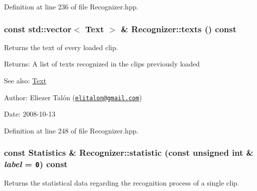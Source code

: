 Definition at line 236 of file Recognizer.hpp.\hypertarget{class_recognizer_2a365c34f1447cdc3311d311e02bf2ed}{
\subsubsection[texts]{\setlength{\rightskip}{0pt plus 5cm}const std::vector$<$ {\bf Text} $>$ \& Recognizer::texts () const}}
\label{class_recognizer_2a365c34f1447cdc3311d311e02bf2ed}


Returns the text of every loaded clip. 

\begin{Desc}
\item[Returns:]A list of texts recognized in the clips previously loaded\end{Desc}
\begin{Desc}
\item[See also:]\hyperlink{class_text}{Text}\end{Desc}
\begin{Desc}
\item[Author:]Eliezer Talón (\href{mailto:elitalon@gmail.com}{\tt elitalon@gmail.com}) \end{Desc}
\begin{Desc}
\item[Date:]2008-10-13 \end{Desc}


Definition at line 248 of file Recognizer.hpp.\hypertarget{class_recognizer_b941b1ad42c3bacb3c829acf7fc689de}{
\subsubsection[statistic]{\setlength{\rightskip}{0pt plus 5cm}const {\bf Statistics} \& Recognizer::statistic (const unsigned int \& {\em label} = {\tt 0}) const}}
\label{class_recognizer_b941b1ad42c3bacb3c829acf7fc689de}


Returns the statistical data regarding the recognition process of a single clip. 

